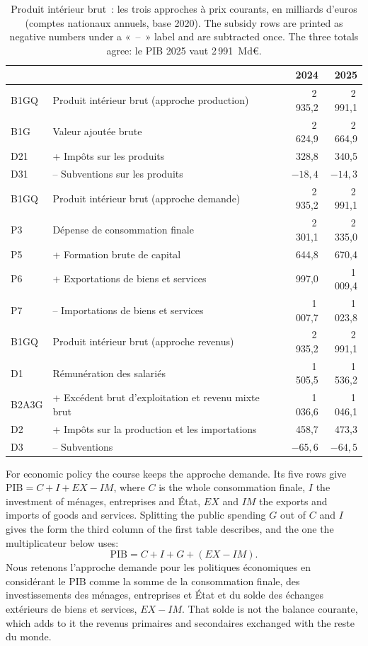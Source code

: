 \begin{table}[h!]
  \centering
  \small
  \begin{tabularx}{\textwidth}{@{}lXrr@{}}
    \toprule
    & & 2024 & 2025 \\
    \midrule
    B1GQ & Produit intérieur brut (approche production) & 2\,935,2 & 2\,991,1 \\
    B1G & \quad Valeur ajoutée brute & 2\,624,9 & 2\,664,9 \\
    D21 & \quad + Impôts sur les produits & 328,8 & 340,5 \\
    D31 & \quad -- Subventions sur les produits & $-18{,}4$ & $-14{,}3$ \\
    \midrule
    B1GQ & Produit intérieur brut (approche demande) & 2\,935,2 & 2\,991,1 \\
    P3 & \quad Dépense de consommation finale & 2\,301,1 & 2\,335,0 \\
    P5 & \quad + Formation brute de capital & 644,8 & 670,4 \\
    P6 & \quad + Exportations de biens et services & 997,0 & 1\,009,4 \\
    P7 & \quad -- Importations de biens et services & 1\,007,7 & 1\,023,8 \\
    \midrule
    B1GQ & Produit intérieur brut (approche revenus) & 2\,935,2 & 2\,991,1 \\
    D1 & \quad Rémunération des salariés & 1\,505,5 & 1\,536,2 \\
    B2A3G & \quad + Excédent brut d'exploitation et revenu mixte brut
      & 1\,036,6 & 1\,046,1 \\
    D2 & \quad + Impôts sur la production et les importations & 458,7 & 473,3 \\
    D3 & \quad -- Subventions & $-65{,}6$ & $-64{,}5$ \\
    \bottomrule
  \end{tabularx}
  \caption*{\small Produit intérieur brut~: les trois approches à prix courants,
    en milliards d'euros (comptes nationaux annuels, base 2020). The subsidy rows
    are printed as negative numbers under a «~--~» label and are subtracted
    once. The three totals agree: le PIB 2025 vaut 2\,991~Md€.}
\end{table}

For economic policy the course keeps the approche demande. Its five rows give
$\text{PIB} = C + I + EX - IM$, where $C$ is the whole consommation finale,
$I$ the investment of ménages, entreprises and État, $EX$ and $IM$ the exports and
imports of goods and services. Splitting the public spending $G$ out of $C$ and
$I$ gives the form the third column of the first table describes, and the one
the multiplicateur below uses:
\[
  \text{PIB} = C + I + G + (EX - IM).
\]
Nous retenons l'approche demande pour les politiques économiques en considérant
le PIB comme la somme de la consommation finale, des investissements des
ménages, entreprises et État et du solde des échanges extérieurs de biens et
services, $EX - IM$. That solde is not the balance courante, which adds to it
the revenus primaires and secondaires exchanged with the reste du monde.

